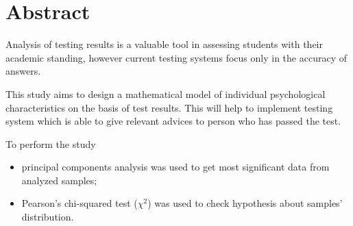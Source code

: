 \chapter*{Abstract}

Analysis of testing results is a valuable tool in assessing students
with their academic standing, however current testing systems focus
only in the accuracy of answers.

This study aims to design a mathematical model of individual
psychological characteristics on the basis of test results.
This will help to implement testing system which is able
to give relevant advices to person who has passed the test.

To perform the study
\begin{itemize}
  \item 
    principal components analysis was used
    to get most significant data from analyzed samples;
  \item
    Pearson's chi-squared test ($\chi^2$) was used to check
    hypothesis about samples' distribution.
\end{itemize}
